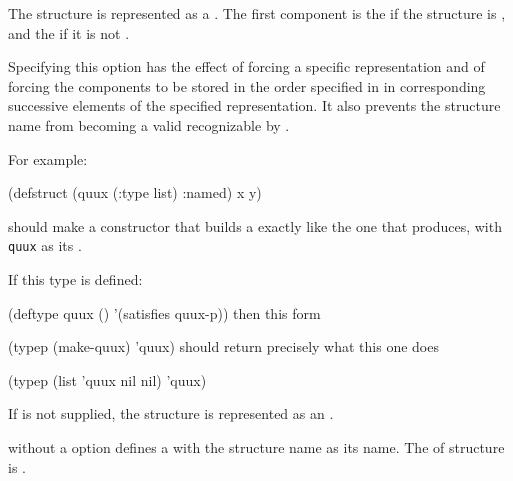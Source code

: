 

The structure is represented as a .
The first component is the  if the structure is ,
and the  if it is not .
\endlist                           

Specifying this option has the effect of forcing
a specific representation and of forcing the components to be
stored in the order specified in  
in corresponding successive elements of the specified representation.
It also prevents the structure name from becoming a valid
 recognizable by .

For example:

\code
 (defstruct (quux (:type list) :named) x y)
\endcode

should make a constructor that builds a  exactly like the one
that  produces, 
with {\tt quux} as its .
 
If this type is defined:
 
\code
 (deftype quux () '(satisfies quux-p))
\endcode
then this form
 
\code
 (typep (make-quux) 'quux)
\endcode
should return precisely what this one does
 
\code
 (typep (list 'quux nil nil) 'quux)
\endcode


If  is not supplied,
the structure is represented as an  .


 without a  option defines a  with
the structure name as its name. The  of structure
 is .  

\endlist

